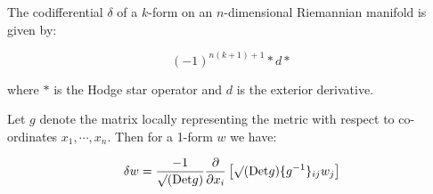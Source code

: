 \documentclass[12pt]{article}
\begin{document}
The codifferential $\delta$ of a $k$-form on an $n$-dimensional
Riemannian manifold is given by:

$$(-1)^{n(k+1)+1}\ast d \ast$$

where $\ast$ is the Hodge star operator and $d$ is the exterior
derivative.

\bigskip
Let $g$ denote the matrix locally representing the metric with
respect to co-ordinates $x_1,\cdots,x_n$. Then for a 1-form $w$ we
have:

$$
\delta w = \frac{-1}{\surd{({\rm Det } g)}} \frac{\partial}{\partial
x_i}\left[\surd{({\rm Det } g)} \{g^{-1}\}_{ij}  w_j \right]
$$
\end{document}
